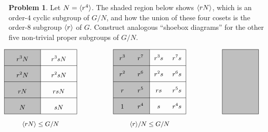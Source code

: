\documentclass[12pt]{article}
\theoremstyle{definition} %
\newtheorem{problem}{Problem}
\begin{document}
\begin{problem}\label{shoebox}
  Let $N=\langle r^4\rangle$. The shaded region below shows $\langle rN\rangle$, which is an order-$4$ cyclic subgroup of $G/N$, and how the union of these four cosets is the order-$8$ subgroup $\langle r\rangle$ of $G$. Construct analogous ``shoebox diagrams'' for the other five non-trivial proper subgroups of $G/N$.
    
    \vspace{-2mm}
    
    \[
    \hspace*{-5mm}
    \begin{tikzpicture}[xscale=.9]
      \tikzstyle{every node}=[font=\small,anchor=south]
      \begin{scope}[shift={(0,0)}]
        \draw[thin,fill=faded] (0,0) rectangle (2,3.2);
        \draw[thin] (0,2.4) to (4,2.4); 
        \draw[thin] (0,1.6) to (4,1.6);
        \draw[thin] (0,.8) to (4,.8);
        \draw[thin] (2,0) to (4,0);
        \draw[thin] (2,3.2) to (4,3.2);
        \draw[thin] (4,0) to (4,3.2);
        \node at (1,.1) {$N$};
        \node at (3,.1) {$sN$};
        \node at (1,.9) {$rN$};
        \node at (3,.9) {$rsN$};
        \node at (1,1.7) {$r^2N$};
        \node at (3,1.7) {$r^2sN$};
        \node at (1,2.5) {$r^3N$};
        \node at (3,2.5) {$r^3sN$};
        \node at (2,-.8) {$\<rN\>\leq G/N$};
      \end{scope}
      \begin{scope}[shift={(6,0)}]
        \draw[thin,fill=faded] (0,0) rectangle (2,3.2);
        \draw[thin] (0,2.4) to (4,2.4); 
        \draw[thin] (0,1.6) to (4,1.6);
        \draw[thin] (0,.8) to (4,.8);
        \draw[thin] (2,0) to (4,0);
        \draw[thin] (2,3.2) to (4,3.2);
        \draw[thin] (4,0) to (4,3.2);
        \node at (.5,.15) {$1$};
        \node at (1.5,.15) {$r^4$};
        \node at (2.5,.15) {$s$};
        \node at (3.5,.15) {$r^4s$};
        \node at (.5,.95) {$r$};
        \node at (1.5,.95) {$r^5$};
        \node at (2.5,.95) {$rs$};
        \node at (3.5,.95) {$r^5s$};
        \node at (.5,1.75) {$r^2$};
        \node at (1.5,1.75) {$r^6$};
        \node at (2.5,1.75) {$r^2s$};
        \node at (3.5,1.75) {$r^6s$};
        \node at (.5,2.55) {$r^3$};
        \node at (1.5,2.55) {$r^7$};
        \node at (2.5,2.55) {$r^3s$};
        \node at (3.5,2.55) {$r^7s$};
        \node at (2,-.8) {$\<r\>/N\leq G/N$};
      \end{scope}
      \begin{scope}[shift={(12,0)}]
        \draw[thin,fill=faded] (0,0) rectangle (2,3.2);

\end{scope}
\end{tikzpicture}\]
\end{problem}
\end{document}
